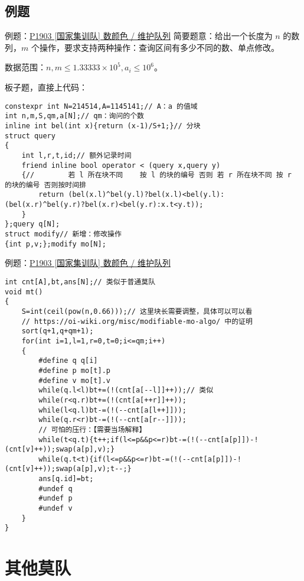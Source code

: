\documentclass[table]{beamer}
\begin{document}
\subsection{例题}
\begin{frame}[fragile]
{例题：{\color{blue}\href{https://www.luogu.com.cn/problem/P1903}{P1903 [国家集训队] 数颜色 / 维护队列}}}
	简要题意：给出一个长度为 $n$ 的数列，$m$ 个操作，要求支持两种操作：查询区间有多少不同的数、单点修改。

	数据范围：$n,m\le 1.33333\times 10^5,a_i\le 10^6$。
	\pause

	板子题，直接上代码：\tiny
\begin{verbatim}
constexpr int N=214514,A=1145141;// A：a 的值域
int n,m,S,qm,a[N];// qm：询问的个数
inline int bel(int x){return (x-1)/S+1;}// 分块
struct query
{
    int l,r,t,id;// 额外记录时间
    friend inline bool operator < (query x,query y)
    {//        若 l 所在块不同    按 l 的块的编号 否则 若 r 所在块不同 按 r 的块的编号 否则按时间排
        return (bel(x.l)^bel(y.l)?bel(x.l)<bel(y.l):(bel(x.r)^bel(y.r)?bel(x.r)<bel(y.r):x.t<y.t));
    }
};query q[N];
struct modify// 新增：修改操作
{int p,v;};modify mo[N];
\end{verbatim}
\end{frame}

\begin{frame}[fragile]
{例题：{\color{blue}\href{https://www.luogu.com.cn/problem/P1903}{P1903 [国家集训队] 数颜色 / 维护队列}}}
\tiny
\begin{verbatim}
int cnt[A],bt,ans[N];// 类似于普通莫队
void mt()
{
    S=int(ceil(pow(n,0.66)));// 这里块长需要调整，具体可以可以看
    // https://oi-wiki.org/misc/modifiable-mo-algo/ 中的证明
    sort(q+1,q+qm+1);
    for(int i=1,l=1,r=0,t=0;i<=qm;i++)
    {
        #define q q[i]
        #define p mo[t].p
        #define v mo[t].v
        while(q.l<l)bt+=(!(cnt[a[--l]]++));// 类似
        while(r<q.r)bt+=(!(cnt[a[++r]]++));
        while(l<q.l)bt-=(!(--cnt[a[l++]]));
        while(q.r<r)bt-=(!(--cnt[a[r--]]));
        // 可怕的压行：【需要当场解释】
        while(t<q.t){t++;if(l<=p&&p<=r)bt-=(!(--cnt[a[p]])-!(cnt[v]++));swap(a[p],v);}
        while(q.t<t){if(l<=p&&p<=r)bt-=(!(--cnt[a[p]])-!(cnt[v]++));swap(a[p],v);t--;}
        ans[q.id]=bt;
        #undef q
        #undef p
        #undef v
    }
}
\end{verbatim}
\end{frame}

\section{其他莫队}
\end{document}

